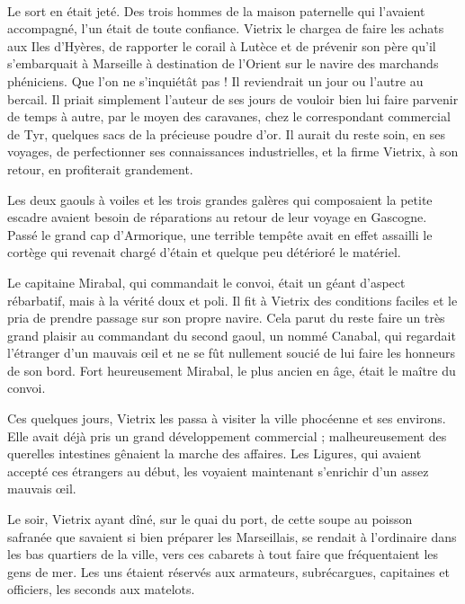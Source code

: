 \documentclass[a4paper, 11pt, oneside, polutonikogreek, french]{article}
\begin{document}
\paragraph{}
Le sort en était jeté. Des trois hommes de la maison paternelle qui l'avaient accompagné, l'un était de toute confiance. Vietrix le chargea de faire les achats aux Iles d'Hyères, de rapporter le corail à Lutèce et de prévenir son père qu'il s'embarquait à Marseille à destination de l'Orient sur le navire des marchands phéniciens. Que l'on ne s'inquiétât pas ! Il reviendrait un jour ou l'autre au bercail. Il priait simplement l'auteur de ses jours de vouloir bien lui faire parvenir de temps à autre, par le moyen des caravanes, chez le correspondant commercial de Tyr, quelques sacs de la précieuse poudre d'or. Il aurait du reste soin, en ses voyages, de perfectionner ses connaissances industrielles, et la firme Vietrix, à son retour, en profiterait grandement.

Les deux gaouls à voiles et les trois grandes galères qui composaient la petite escadre avaient besoin de réparations au retour de leur voyage en Gascogne. Passé le grand cap d'Armorique, une terrible tempête avait en effet assailli le cortège qui revenait chargé d'étain et quelque peu détérioré le matériel.

Le capitaine Mirabal, qui commandait le convoi, était un géant d'aspect rébarbatif, mais à la vérité doux et poli. Il fit à Vietrix des conditions faciles et le pria de prendre passage sur son propre navire. Cela parut du reste faire un très grand plaisir au commandant du second gaoul, un nommé Canabal, qui regardait l'étranger d'un mauvais œil et ne se fût nullement soucié de lui faire les honneurs de son bord. Fort heureusement Mirabal, le plus ancien en âge, était le maître du convoi.

\bigskip
\centerline{\EightStarTaper}
\centerline{\EightStarTaper\EightStarTaper}
\bigskip

Ces quelques jours, Vietrix les passa à visiter la ville phocéenne et ses environs. Elle avait déjà pris un grand développement commercial ; malheureusement des querelles intestines gênaient la marche des affaires. Les Ligures, qui avaient accepté ces étrangers au début, les voyaient maintenant s'enrichir d'un assez mauvais œil.

Le soir, Vietrix ayant dîné, sur le quai du port, de cette soupe au poisson safranée que savaient si bien préparer les Marseillais, se rendait à l'ordinaire dans les bas quartiers de la ville, vers ces cabarets à tout faire que fréquentaient les gens de mer. Les uns étaient réservés aux armateurs, subrécargues, capitaines et officiers, les seconds aux matelots.
\end{document}
